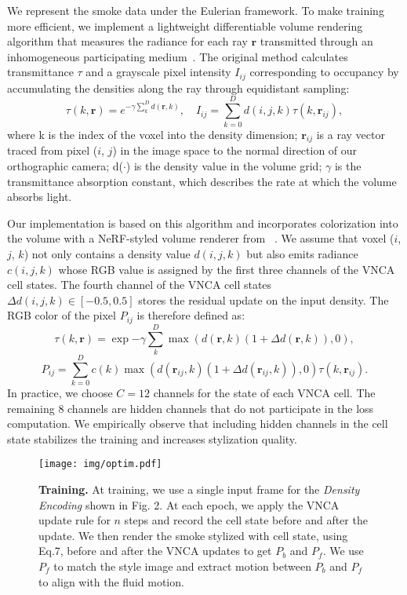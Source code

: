 \medskip
{} 
\label{sec:dvr}
We represent the smoke data under the Eulerian framework. 
To make training more efficient, we implement a lightweight differentiable volume rendering algorithm that measures the radiance for each ray $\mathbf{r}$ transmitted through an inhomogeneous participating medium~\cite{fong2017production}. 
The original method calculates transmittance $\tau$ and a grayscale pixel intensity $I_{ij}$ corresponding to occupancy by accumulating the densities along the ray through equidistant sampling:
\begin{equation}
    \tau(k, \mathbf{r}) = e^{-\gamma\sum_k^D d(\mathbf{r}, k)}, \quad I_{ij} = \sum_{k=0}^D d(i,j,k)\tau(k, \mathbf{r}_{ij}),
\end{equation}
where k is the index of the voxel into the density dimension; $\mathbf{r}_{ij}$ is a ray vector traced from pixel ($i$, $j$) in the image space to the normal direction of our orthographic camera; d($\cdot$) is the density value in the volume grid; $\gamma$ is the transmittance absorption constant, which describes the rate at which the volume absorbs light. 

Our implementation is based on this algorithm and incorporates colorization into the volume with a NeRF-styled volume renderer from ~\citet{mildenhall2020nerf}. 
We assume that voxel ($i$, $j$, $k$) not only contains a density value $d(i,j,k)$ but also emits radiance $c(i,j,k)$ whose RGB value is assigned by the first three channels of the VNCA cell states. 
The fourth channel of the VNCA cell states $\Delta d(i,j,k)\in [-0.5, 0.5] $ stores the residual update on the input density. 
The RGB color of the pixel $P_{ij}$ is therefore defined as:
\begin{equation}
    \tau(k, \mathbf{r}) = \exp{-\gamma\sum_k^D \max(d(\mathbf{r}, k)( 1 + \Delta d(\mathbf{r}, k)), 0)},
\end{equation}
\begin{equation}
\label{eq:render}
P_{ij} = \sum^D_{k=0} c(k)\max(d(\mathbf{r}_{ij},k)(1 + \Delta d(\mathbf{r}_{ij},k)), 0)\tau(k, \mathbf{r}_{ij}). 
\end{equation}
In practice, we choose $C = 12$ channels for the state of each VNCA cell. The remaining 8 channels are hidden channels that do not participate in the loss computation. 
We empirically observe that including hidden channels in the cell state stabilizes the training and increases stylization quality.

\begin{figure}
  \centering
  \texttt{[image: img/optim.pdf]}
  \caption{\textbf{Training.} At training, we use a single input frame for the \textit{Density Encoding} shown in Fig. 2. At each epoch, we apply the VNCA update rule for $n$ steps and record the cell state before and after the update. We then render the smoke stylized with cell state, using Eq.7, before and after the VNCA updates to get $P_b$ and $P_f$. We use $P_f$ to match the style image and extract motion between $P_b$ and $P_f$ to align with the fluid motion. }
  \label{fig:optim}
\end{figure}


